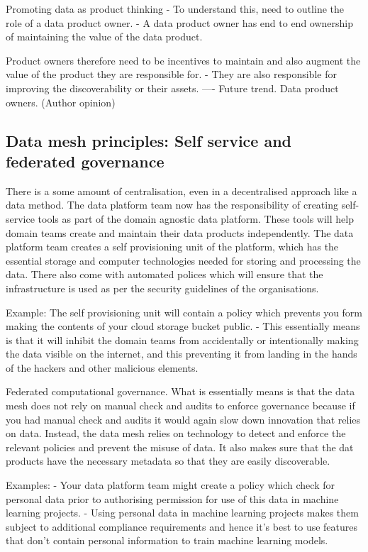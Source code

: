 \documentclass[a4paper, 11pt]{article}
\begin{document}
    Promoting data as product thinking
    - To understand this, need to outline the role of a data product owner.
    - A data product owner has end to end ownership of maintaining the value of the data product.

    Product owners therefore need to be incentives to maintain and also augment the value of the product they are responsible for.
    - They are also responsible for improving the discoverability or their assets.
    ---- Future trend. Data product owners. (Author opinion)

    \subsection{Data mesh principles: Self service and federated governance}
    There is a some amount of centralisation, even in a decentralised approach like a data method.
    The data platform team now has the responsibility of creating self-service tools as part of the domain agnostic data platform.
    These tools will help domain teams create and maintain their data products independently.
    The data platform team creates a self provisioning unit of the platform, which has the essential storage and computer technologies needed for storing and processing the data.
    There also come with automated polices which will ensure that the infrastructure is used as per the security guidelines of the organisations.

    Example: The self provisioning unit will contain a policy which prevents you form making the contents of your cloud storage bucket public.
    - This essentially means is that it will inhibit the domain teams from accidentally or intentionally making the data visible on the internet, and this preventing it from landing in the hands of the hackers and other malicious elements.

    Federated computational governance.
    What is essentially means is that the data mesh does not rely on manual check and audits to enforce governance because if you had manual check and audits it would again slow down innovation that relies on data.
    Instead, the data mesh relies on technology to detect and enforce the relevant policies and prevent the misuse of data.
    It also makes sure that the dat products have the necessary metadata so that they are easily discoverable.

    Examples:
    - Your data platform team might create a policy which check for personal data prior to authorising permission for use of this data in machine learning projects.
    - Using personal data in machine learning projects makes them subject to additional compliance requirements and hence it's best to use features that don't contain personal information to train machine learning models.
\end{document}
